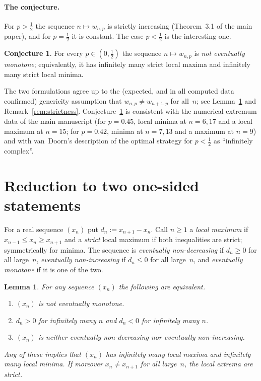 \documentclass[11pt]{article}
\newtheorem{lemma}[theorem]{Lemma}
\theoremstyle{definition}
\newtheorem{conjecture}[theorem]{Conjecture}
\begin{document}
\paragraph{The conjecture.} For $p>\tfrac12$ the sequence $n\mapsto
w_{n,p}$ is strictly increasing (Theorem~3.1 of the main paper), and
for $p=\tfrac12$ it is constant. The case $p<\tfrac12$ is the
interesting one.

\begin{conjecture}\label{conj:main}
  For every $p\in(0,\tfrac12)$ the sequence $n\mapsto w_{n,p}$ is
  \emph{not eventually monotone}; equivalently, it has infinitely many
  strict local maxima and infinitely many strict local minima.
\end{conjecture}

The two formulations agree up to the (expected, and in all computed
data confirmed) genericity assumption that $w_{n,p}\ne w_{n+1,p}$ for
all~$n$; see Lemma~\ref{lem:reduction} and
Remark~\ref{rem:strictness}. Conjecture~\ref{conj:main} is consistent
with the numerical extremum data of the main manuscript (for $p=0.45$,
local minima at $n=6,17$ and a local maximum at $n=15$; for $p=0.42$,
minima at $n=7,13$ and a maximum at $n=9$) and with van~Doorn's
description of the optimal strategy for $p<\tfrac12$ as ``infinitely
complex''.

\section{Reduction to two one-sided statements}\label{sec:reduction}

For a real sequence $(x_n)$ put $d_n:=x_{n+1}-x_n$. Call $n\ge 1$ a
\emph{local maximum} if $x_{n-1}\le x_n\ge x_{n+1}$ and a \emph{strict}
local maximum if both inequalities are strict; symmetrically for
minima. The sequence is \emph{eventually non-decreasing} if $d_n\ge 0$
for all large~$n$, \emph{eventually non-increasing} if $d_n\le 0$ for
all large~$n$, and \emph{eventually monotone} if it is one of the two.

\begin{lemma}\label{lem:reduction}
  For any sequence $(x_n)$ the following are equivalent.
  \begin{enumerate}[label=\rm(\roman*),leftmargin=2.4em]
  \item $(x_n)$ is not eventually monotone.
  \item $d_n>0$ for infinitely many $n$ \emph{and} $d_n<0$ for
    infinitely many $n$.
  \item $(x_n)$ is neither eventually non-decreasing nor eventually
    non-increasing.
  \end{enumerate}
  Any of these implies that $(x_n)$ has infinitely many local maxima
  and infinitely many local minima. If moreover $x_n\ne x_{n+1}$ for
  all large~$n$, the local extrema are strict.
\end{lemma}
\end{document}
